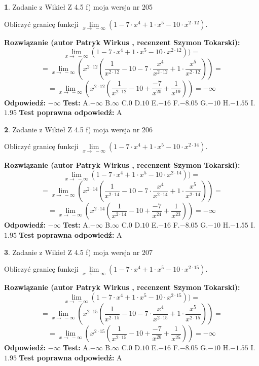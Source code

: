 \documentclass[12pt, a4paper]{article}
\theoremstyle{definition} %
\newtheorem{zad}{}
\newcommand{\zadStart}[1]{\begin{zad}#1\newline}
\newcommand{\zadStop}{\end{zad}}
\newcommand{\rozwStart}[2]{\noindent \textbf{Rozwiązanie (autor #1 , recenzent #2): }\newline}
\newcommand{\rozwStop}{\newline}
\newcommand{\odpStart}{\noindent \textbf{Odpowiedź:}\newline}
\newcommand{\odpStop}{\newline}
\newcommand{\testStart}{\noindent \textbf{Test:}\newline}
\newcommand{\testStop}{\newline}
\newcommand{\kluczStart}{\noindent \textbf{Test poprawna odpowiedź:}\newline}
\newcommand{\kluczStop}{\newline}
\begin{document}
\zadStart{Zadanie z Wikieł Z 4.5 f) moja wersja nr 205}


Obliczyć granicę funkcji  $\lim\limits_{x\to\ -\infty}(1 - 7 \cdot x^{4}+1 \cdot x^{5}- 10 \cdot x^{2\cdot12})$.
\zadStop
\rozwStart{Patryk Wirkus}{Szymon Tokarski}
$$\lim\limits_{x\to\ -\infty}(1 - 7 \cdot x^{4}+1 \cdot x^{5}- 10 \cdot x^{2\cdot12}))=$$
$$=\lim\limits_{x\to\ -\infty}(x^{2\cdot12}(\frac{1}{x^{2\cdot12}}-10 -7 \cdot \frac{x^{4}}{x^{2\cdot12}}+1 \cdot \frac{x^{5}}{x^{2\cdot12}}))=$$
$$=\lim\limits_{x\to\ -\infty}(x^{2\cdot12}(\frac{1}{x^{2\cdot12}}-10 + \frac{-7}{x^{20}}+ \frac{1}{x^{19}}))=-\infty$$
\rozwStop
\odpStart
$-\infty$
\odpStop
\testStart
A.$-\infty$ B.$\infty$ C.$0$ D.$10$ E.$-16$
F.$-8.05$ G.$-10$
H.$-1.55$
I.$1.95$
\testStop
\kluczStart
A
\kluczStop



\zadStart{Zadanie z Wikieł Z 4.5 f) moja wersja nr 206}


Obliczyć granicę funkcji  $\lim\limits_{x\to\ -\infty}(1 - 7 \cdot x^{4}+1 \cdot x^{5}- 10 \cdot x^{2\cdot14})$.
\zadStop
\rozwStart{Patryk Wirkus}{Szymon Tokarski}
$$\lim\limits_{x\to\ -\infty}(1 - 7 \cdot x^{4}+1 \cdot x^{5}- 10 \cdot x^{2\cdot14}))=$$
$$=\lim\limits_{x\to\ -\infty}(x^{2\cdot14}(\frac{1}{x^{2\cdot14}}-10 -7 \cdot \frac{x^{4}}{x^{2\cdot14}}+1 \cdot \frac{x^{5}}{x^{2\cdot14}}))=$$
$$=\lim\limits_{x\to\ -\infty}(x^{2\cdot14}(\frac{1}{x^{2\cdot14}}-10 + \frac{-7}{x^{24}}+ \frac{1}{x^{23}}))=-\infty$$
\rozwStop
\odpStart
$-\infty$
\odpStop
\testStart
A.$-\infty$ B.$\infty$ C.$0$ D.$10$ E.$-16$
F.$-8.05$ G.$-10$
H.$-1.55$
I.$1.95$
\testStop
\kluczStart
A
\kluczStop



\zadStart{Zadanie z Wikieł Z 4.5 f) moja wersja nr 207}


Obliczyć granicę funkcji  $\lim\limits_{x\to\ -\infty}(1 - 7 \cdot x^{4}+1 \cdot x^{5}- 10 \cdot x^{2\cdot15})$.
\zadStop
\rozwStart{Patryk Wirkus}{Szymon Tokarski}
$$\lim\limits_{x\to\ -\infty}(1 - 7 \cdot x^{4}+1 \cdot x^{5}- 10 \cdot x^{2\cdot15}))=$$
$$=\lim\limits_{x\to\ -\infty}(x^{2\cdot15}(\frac{1}{x^{2\cdot15}}-10 -7 \cdot \frac{x^{4}}{x^{2\cdot15}}+1 \cdot \frac{x^{5}}{x^{2\cdot15}}))=$$
$$=\lim\limits_{x\to\ -\infty}(x^{2\cdot15}(\frac{1}{x^{2\cdot15}}-10 + \frac{-7}{x^{26}}+ \frac{1}{x^{25}}))=-\infty$$
\rozwStop
\odpStart
$-\infty$
\odpStop
\testStart
A.$-\infty$ B.$\infty$ C.$0$ D.$10$ E.$-16$
F.$-8.05$ G.$-10$
H.$-1.55$
I.$1.95$
\testStop
\kluczStart
A
\kluczStop
\end{document}

